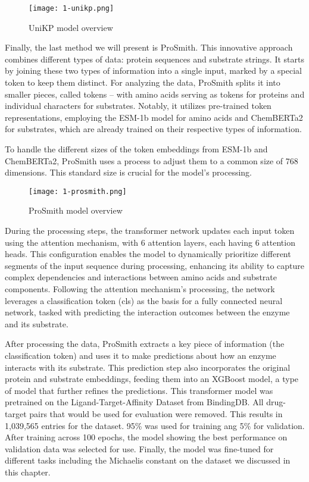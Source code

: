 \begin{figure}
  \centering
  \texttt{[image: 1-unikp.png]}
  \caption{UniKP model overview}
  \label{fig:unikp}
\end{figure}

Finally, the last method we will present is ProSmith. \cite{prosmith} This innovative approach combines different types of data: protein sequences and substrate strings. It starts by joining these two types of information into a single input, marked by a special token to keep them distinct. For analyzing the data, ProSmith splits it into smaller pieces, called tokens – with amino acids serving as tokens for proteins and individual characters for substrates. Notably, it utilizes pre-trained token representations, employing the ESM-1b model for amino acids and ChemBERTa2 for substrates, which are already trained on their respective types of information. \cite{esm1,chemberta} 

To handle the different sizes of the token embeddings from ESM-1b and ChemBERTa2, ProSmith uses a process to adjust them to a common size of 768 dimensions. This standard size is crucial for the model's processing.

\begin{figure}
  \centering
  \texttt{[image: 1-prosmith.png]}
  \caption{ProSmith model overview}
  \label{fig:prosmith}
\end{figure}

During the processing steps, the transformer network updates each input token using the attention mechanism, with 6 attention layers, each having 6 attention heads. \cite{attention} This configuration enables the model to dynamically prioritize different segments of the input sequence during processing, enhancing its ability to capture complex dependencies and interactions between amino acids and substrate components. Following the attention mechanism's processing, the network leverages a classification token (cls) as the basis for a fully connected neural network, tasked with predicting the interaction outcomes between the enzyme and its substrate.

After processing the data, ProSmith extracts a key piece of information (the classification token) and uses it to make predictions about how an enzyme interacts with its substrate. This prediction step also incorporates the original protein and substrate embeddings, feeding them into an XGBoost model, a type of model that further refines the predictions. \cite{xgboost} This transformer model was pretrained on the Ligand-Target-Affinity Dataset from BindingDB. \cite{bindingdb} All drug-target pairs that would be used for evaluation were removed. This results in 1,039,565 entries for the dataset. 95\% was used for training ang 5\% for validation. After training across 100 epochs, the model showing the best performance on validation data was selected for use. Finally, the model was fine-tuned for different tasks including the Michaelis constant on the dataset we discussed in this chapter.

